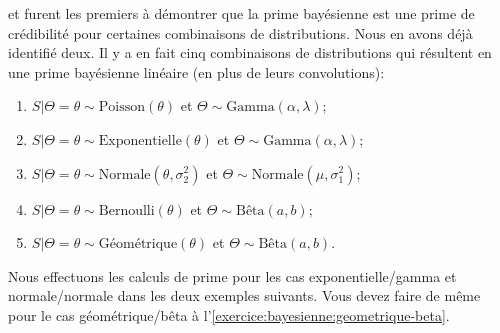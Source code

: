 \cite{Whitney:1918} et \cite{Bailey:1950} furent les premiers à
démontrer que la prime bayésienne est une prime de crédibilité pour
certaines combinaisons de distributions. Nous en avons déjà identifié
deux. Il y a en fait cinq combinaisons de distributions qui résultent
en une prime bayésienne linéaire (en plus de leurs convolutions):
\begin{enumerate}
\item $S|\Theta = \theta \sim \text{Poisson}(\theta)$ et $\Theta \sim
  \text{Gamma}(\alpha, \lambda)$;
\item $S|\Theta = \theta \sim \text{Exponentielle}(\theta)$ et $\Theta \sim
  \text{Gamma}(\alpha, \lambda)$;
\item $S|\Theta = \theta \sim \text{Normale}(\theta, \sigma^2_2)$ et $\Theta \sim
  \text{Normale}(\mu, \sigma^2_1)$;
\item $S|\Theta = \theta \sim \text{Bernoulli}(\theta)$ et $\Theta \sim
  \text{Bêta}(a, b)$;
\item $S|\Theta = \theta \sim \text{Géométrique}(\theta)$ et $\Theta \sim
  \text{Bêta}(a, b)$.
\end{enumerate}

Nous effectuons les calculs de prime pour les cas exponentielle/gamma
et normale/normale dans les deux exemples suivants. Vous devez faire
de même pour le cas géométrique/bêta à
l'\autoref{exercice:bayesienne:geometrique-beta}.

